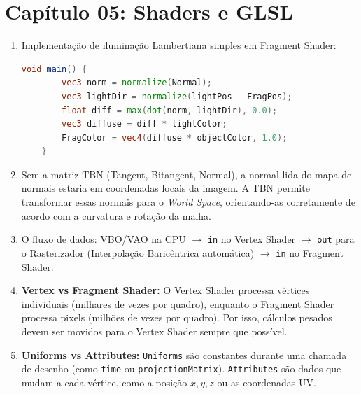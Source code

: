 \section*{Capítulo 05: Shaders e GLSL}
\begin{enumerate}
    \item Implementação de iluminação Lambertiana simples em Fragment Shader:
    \begin{lstlisting}[language=GLSL]
    void main() {
        vec3 norm = normalize(Normal);
        vec3 lightDir = normalize(lightPos - FragPos);
        float diff = max(dot(norm, lightDir), 0.0);
        vec3 diffuse = diff * lightColor;
        FragColor = vec4(diffuse * objectColor, 1.0);
    }
    \end{lstlisting}
    \item Sem a matriz TBN (Tangent, Bitangent, Normal), a normal lida do mapa de normais estaria em coordenadas locais da imagem. A TBN permite transformar essas normais para o \textit{World Space}, orientando-as corretamente de acordo com a curvatura e rotação da malha.
    \item O fluxo de dados: VBO/VAO na CPU $\to$ \texttt{in} no Vertex Shader $\to$ \texttt{out} para o Rasterizador (Interpolação Baricêntrica automática) $\to$ \texttt{in} no Fragment Shader.
    \item \textbf{Vertex vs Fragment Shader:} O Vertex Shader processa vértices individuais (milhares de vezes por quadro), enquanto o Fragment Shader processa pixels (milhões de vezes por quadro). Por isso, cálculos pesados devem ser movidos para o Vertex Shader sempre que possível.
    \item \textbf{Uniforms vs Attributes:} \texttt{Uniforms} são constantes durante uma chamada de desenho (como \texttt{time} ou \texttt{projectionMatrix}). \texttt{Attributes} são dados que mudam a cada vértice, como a posição $x,y,z$ ou as coordenadas UV.
\end{enumerate}

